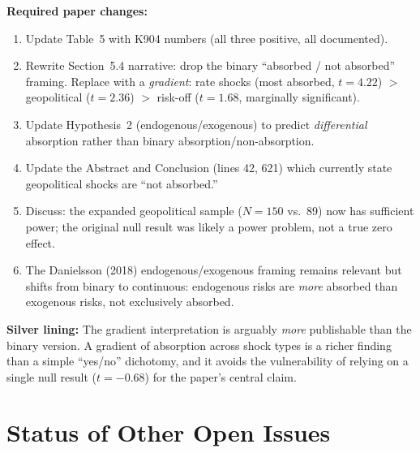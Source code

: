 \documentclass[12pt,a4paper]{article}
\begin{document}
\textbf{Required paper changes:}
\begin{enumerate}[nosep]
\item Update Table~5 with K904 numbers (all three positive, all documented).
\item Rewrite Section~5.4 narrative: drop the binary ``absorbed / not absorbed'' framing. Replace with a \textit{gradient}: rate shocks (most absorbed, $t = 4.22$) $>$ geopolitical ($t = 2.36$) $>$ risk-off ($t = 1.68$, marginally significant).
\item Update Hypothesis~2 (endogenous/exogenous) to predict \textit{differential} absorption rather than binary absorption/non-absorption.
\item Update the Abstract and Conclusion (lines 42, 621) which currently state geopolitical shocks are ``not absorbed.''
\item Discuss: the expanded geopolitical sample ($N = 150$ vs.\ 89) now has sufficient power; the original null result was likely a power problem, not a true zero effect.
\item The Danielsson (2018) endogenous/exogenous framing remains relevant but shifts from binary to continuous: endogenous risks are \textit{more} absorbed than exogenous risks, not exclusively absorbed.
\end{enumerate}

\textbf{Silver lining:} The gradient interpretation is arguably \textit{more} publishable than the binary version.
A gradient of absorption across shock types is a richer finding than a simple ``yes/no'' dichotomy, and it avoids the vulnerability of relying on a single null result ($t = -0.68$) for the paper's central claim.

\bigskip

\section*{Status of Other Open Issues}
\end{document}
